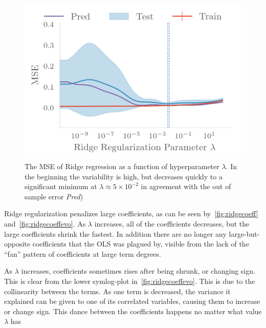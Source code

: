 \begin{figure}[]
  \centering
  \includegraphics[]{figures/ridgemse.png}
  \caption{\label{fig:ridgemse} The MSE of Ridge regression as a function of
    hyperparameter \(\lambda\). In the beginning the variability is high, but
    decreases quickly to a significant minimum at \(\lambda\approx 5\times
    10^{-2}\)  in agreement with the out of sample error \textit{Pred})}
\end{figure}

Ridge regularization penalizes large coefficients, as can be seen
by~\cref{fig:ridgecoeff} and~\cref{fig:ridgecoeffevo}. As \(\lambda\) increases,
all of the coefficients decreases, but the large coefficients shrink the
fastest. In addition there are no longer any large-but-opposite coefficients
that the OLS was plagued by, visible from the lack of the ``fan'' pattern of coefficients
at large term degrees. 

As \(\lambda\) increases, coefficients sometimes rises after being shrunk, or
changing sign. This is clear from the lower symlog-plot
in~\cref{fig:ridgecoeffevo}. This is due to the collinearity between the terms.
As one term is decreased, the variance it explained can be given to one of its
correlated variables, causing them to increase or change sign. This dance
between the coefficients happens no matter what value  \(\lambda\) has


